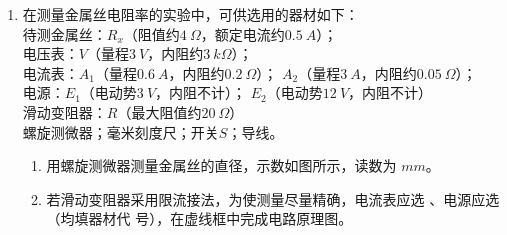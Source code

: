 

\begin{enumerate}
\item
{}
在测量金属丝电阻率的实验中，可供选用的器材如下：\\
待测金属丝：$ R_{x} $（阻值约$ 4 \ \Omega $，额定电流约$ 0.5 \ A $）；\\
电压表：$ V $（量程$ 3 \ V $，内阻约$ 3 \ k\Omega $）；\\
电流表：$ A_{1} $（量程$ 0.6 \ A $，内阻约$ 0.2 \ \Omega $）； \quad $ A_{2} $（量程$ 3 \ A $，内阻约$ 0.05 \ \Omega $）；\\
电源：$ E_{1} $（电动势$ 3 \ V $，内阻不计）； \quad $ E_{2} $（电动势$ 12 \ V $，内阻不计）\\
滑动变阻器：$ R $（最大阻值约$ 20 \ \Omega $）\\
螺旋测微器；毫米刻度尺；开关$ S $；导线。



\begin{enumerate}
\item
用螺旋测微器测量金属丝的直径，示数如图所示，读数为
\underlinegap 
$ mm $。
\begin{figure}[h!]
\centering

\end{figure}

\item 
若滑动变阻器采用限流接法，为使测量尽量精确，电流表应选
\underlinegap 
、电源应选
\underlinegap 
（均填器材代
号），在虚线框中完成电路原理图。
\begin{figure}[h!]
\centering

\end{figure}


\end{enumerate}




\end{enumerate}
